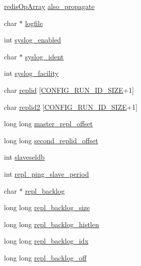 \begin{DoxyCompactItemize}
\begin{tabbing}
\end{tabbing}\item 
\hyperlink{structredis_op_array}{redis\+Op\+Array} \hyperlink{structredis_server_ab052b1f4d90e418f3ebca7f25debec8d}{also\+\_\+propagate}
\item 
char $\ast$ \hyperlink{structredis_server_a539bec706ac5acbbdef66f363a7a2524}{logfile}
\item 
int \hyperlink{structredis_server_a1e234838fd4211781e47a97ca8dd03cc}{syslog\+\_\+enabled}
\item 
char $\ast$ \hyperlink{structredis_server_ae4a6e447ef5fbc09a9765fa2da7c51d7}{syslog\+\_\+ident}
\item 
int \hyperlink{structredis_server_a4f074cb73b7191ef570261fb35b29a8e}{syslog\+\_\+facility}
\item 
char \hyperlink{structredis_server_a467ab80673fbca31b4729a65effc8362}{replid} \mbox{[}\hyperlink{server_8h_aba6794fa3ee28f85165eaed93190f1df}{C\+O\+N\+F\+I\+G\+\_\+\+R\+U\+N\+\_\+\+I\+D\+\_\+\+S\+I\+ZE}+1\mbox{]}
\item 
char \hyperlink{structredis_server_a06df01ff396d99c1b22692272de940d7}{replid2} \mbox{[}\hyperlink{server_8h_aba6794fa3ee28f85165eaed93190f1df}{C\+O\+N\+F\+I\+G\+\_\+\+R\+U\+N\+\_\+\+I\+D\+\_\+\+S\+I\+ZE}+1\mbox{]}
\item 
long long \hyperlink{structredis_server_a6ba0eb500edf919e115c9d159b991cd1}{master\+\_\+repl\+\_\+offset}
\item 
long long \hyperlink{structredis_server_aa63d306ce9b3447e242ab5eafab120a5}{second\+\_\+replid\+\_\+offset}
\item 
int \hyperlink{structredis_server_a5d8345cb446035f33a1ff2c093870f35}{slaveseldb}
\item 
int \hyperlink{structredis_server_a86ac125d831ba2b0ad05e80972cdb0d2}{repl\+\_\+ping\+\_\+slave\+\_\+period}
\item 
char $\ast$ \hyperlink{structredis_server_acabb38054cd6d1d619d7c19d3e57bf28}{repl\+\_\+backlog}
\item 
long long \hyperlink{structredis_server_a036a70cd5499d31b3b3964aeb182cd97}{repl\+\_\+backlog\+\_\+size}
\item 
long long \hyperlink{structredis_server_ad76d83545056feccc5ff262ed29488c6}{repl\+\_\+backlog\+\_\+histlen}
\item 
long long \hyperlink{structredis_server_ae11d40717bf4cf77473590daf20922db}{repl\+\_\+backlog\+\_\+idx}
\item 
long long \hyperlink{structredis_server_aa215648deded4376d85651aa4e999815}{repl\+\_\+backlog\+\_\+off}

\end{DoxyCompactItemize}
